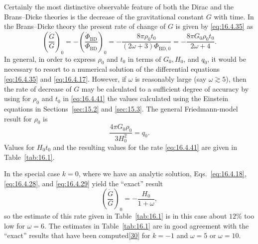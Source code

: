 Certainly the most distinctive observable feature of both the Dirac and the
Brans--Dicke theories is the decrease of the gravitational constant \(G\) with
time. In the Brans--Dicke theory the present rate of change of \(G\) is given
by \eqref{eq:16.4.35} as
\begin{equation}
  \left(\frac{\dot G}{G}\right)_0
  =
  -\left(\frac{\dot\Phi_{\mathrm{BD}}}
              {\Phi_{\mathrm{BD}}}\right)_0
  =
  -\frac{8\pi\rho_0t_0}
        {(2\omega+3)\Phi_{\mathrm{BD},0}}
  =
  -\frac{8\pi G_0\rho_0t_0}{2\omega+4}.
  \tag{16.4.41}\label{eq:16.4.41}
\end{equation}
In general, in order to express \(\rho_0\) and \(t_0\) in terms of
\(G_0,H_0\), and \(q_0\), it would be necessary to resort to a numerical
solution of the differential equations \eqref{eq:16.4.35} and
\eqref{eq:16.4.17}. However, if \(\omega\) is reasonably large (say
\(\omega\gtrsim5\)), then the rate of decrease of \(G\) may be calculated to
a sufficient degree of accuracy by using for \(\rho_0\) and \(t_0\) in
\eqref{eq:16.4.41} the values calculated using the Einstein equations in
Sections~\ref{sec:15.2} and \ref{sec:15.3}. The general Friedmann-model result
for \(\rho_0\) is
\begin{equation}
  \frac{4\pi G_0\rho_0}{3H_0^2}=q_0.
  \tag{16.4.42}\label{eq:16.4.42}
\end{equation}
Values for \(H_0t_0\) and the resulting values for the rate
\eqref{eq:16.4.41} are given in Table~\ref{tab:16.1}.

In the special case \(k=0\), where we have an analytic solution,
Eqs.~\eqref{eq:16.4.18}, \eqref{eq:16.4.28}, and \eqref{eq:16.4.29} yield
the ``exact'' result
\[
  \left(\frac{\dot G}{G}\right)_0
  =
  -\frac{H_0}{1+\omega},
\]
so the estimate of this rate given in Table~\ref{tab:16.1} is in this case
about \(12\%\) too low for \(\omega=6\). The estimates in Table~\ref{tab:16.1}
are in good agreement with the ``exact'' results that have been
computed\hyperref[ch16-ref-30]{[30]} for \(k=-1\) and \(\omega=5\) or
\(\omega=10\).

